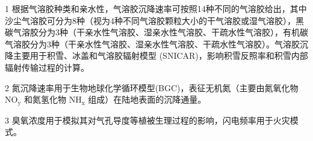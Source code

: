 {\begin{table}[htbp]
\begin{threeparttable}
\begin{tabular}{lcc}
      \end{tabular}
      \begin{tablenotes}
        \footnotesize
      \item[1] 根据气溶胶种类和亲水性，气溶胶沉降速率可按照14种不同的气溶胶给出，其中沙尘气溶胶可分为8种（视为4种不同气溶胶颗粒大小的干气溶胶或湿气溶胶），黑碳气溶胶分为3种（干亲水性气溶胶、湿亲水性气溶胶、干疏水性气溶胶），有机碳气溶胶分为3种（干亲水性气溶胶、湿亲水性气溶胶、干疏水性气溶胶）。气溶胶沉降主要用于积雪、冰盖和气溶胶辐射模型 (SNICAR)，影响积雪反照率和积雪内部辐射传输过程的计算。
      \item[2] 氮沉降速率用于生物地球化学循环模型(BGC)，表征无机氮（主要由氮氧化物 $\mathrm{NO_y}$ 和氮氢化物 $\mathrm{NH_x}$ 组成）在陆地表面的沉降通量。
      \item[3] 臭氧浓度用于模拟其对气孔导度等植被生理过程的影响，闪电频率用于火灾模式。
      \end{tablenotes}
    \end{threeparttable}
  \end{table}
}


